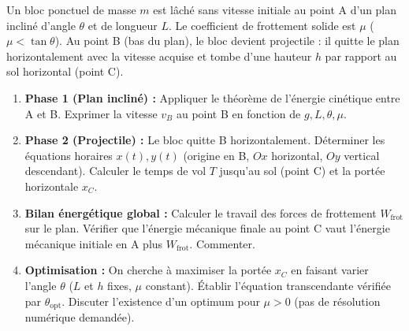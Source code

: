 \documentclass[11pt]{article}
\begin{document}
\begin{exercice}
Un bloc ponctuel de masse $m$ est lâché sans vitesse initiale au point A d'un plan incliné d'angle $\theta$ et de longueur $L$. Le coefficient de frottement solide est $\mu$ ($\mu < \tan\theta$). Au point B (bas du plan), le bloc devient projectile : il quitte le plan horizontalement avec la vitesse acquise et tombe d'une hauteur $h$ par rapport au sol horizontal (point C).
\begin{enumerate}
    \item \textbf{Phase 1 (Plan incliné) :} Appliquer le théorème de l'énergie cinétique entre A et B. Exprimer la vitesse $v_B$ au point B en fonction de $g, L, \theta, \mu$.
    \item \textbf{Phase 2 (Projectile) :} Le bloc quitte B horizontalement. Déterminer les équations horaires $x(t), y(t)$ (origine en B, $Ox$ horizontal, $Oy$ vertical descendant). Calculer le temps de vol $T$ jusqu'au sol (point C) et la portée horizontale $x_C$.
    \item \textbf{Bilan énergétique global :} Calculer le travail des forces de frottement $W_{\text{frot}}$ sur le plan. Vérifier que l'énergie mécanique finale au point C vaut l'énergie mécanique initiale en A plus $W_{\text{frot}}$. Commenter.
    \item \textbf{Optimisation :} On cherche à maximiser la portée $x_C$ en faisant varier l'angle $\theta$ ($L$ et $h$ fixes, $\mu$ constant). Établir l'équation transcendante vérifiée par $\theta_{\text{opt}}$. Discuter l'existence d'un optimum pour $\mu > 0$ (pas de résolution numérique demandée).
\end{enumerate}
\end{exercice}
\end{document}
